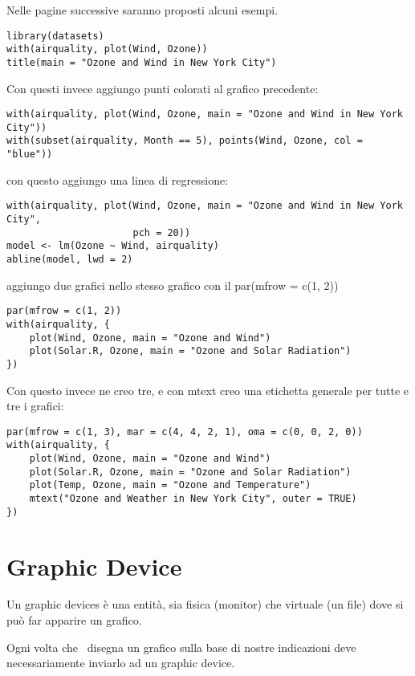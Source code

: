 Nelle pagine successive saranno proposti alcuni esempi.
\begin{lstlisting}
library(datasets)
with(airquality, plot(Wind, Ozone))
title(main = "Ozone and Wind in New York City") 
\end{lstlisting} 

Con questi invece aggiungo punti colorati al grafico precedente:
\begin{lstlisting}
with(airquality, plot(Wind, Ozone, main = "Ozone and Wind in New York City"))
with(subset(airquality, Month == 5), points(Wind, Ozone, col = "blue"))
\end{lstlisting} 



con questo aggiungo una linea di regressione:
\begin{lstlisting}
with(airquality, plot(Wind, Ozone, main = "Ozone and Wind in New York City", 
                      pch = 20))
model <- lm(Ozone ~ Wind, airquality)
abline(model, lwd = 2)
\end{lstlisting} 

aggiungo due grafici nello stesso grafico con il par(mfrow = c(1, 2))

\begin{lstlisting}
par(mfrow = c(1, 2))
with(airquality, {
    plot(Wind, Ozone, main = "Ozone and Wind")
    plot(Solar.R, Ozone, main = "Ozone and Solar Radiation")
})
\end{lstlisting} 

Con questo invece ne creo tre, e con mtext creo una etichetta generale per tutte e tre i grafici:
\begin{lstlisting}
par(mfrow = c(1, 3), mar = c(4, 4, 2, 1), oma = c(0, 0, 2, 0))
with(airquality, {
    plot(Wind, Ozone, main = "Ozone and Wind")
    plot(Solar.R, Ozone, main = "Ozone and Solar Radiation")
    plot(Temp, Ozone, main = "Ozone and Temperature")
    mtext("Ozone and Weather in New York City", outer = TRUE)
})
\end{lstlisting} 

\section{Graphic Device}

Un graphic devices è una entità, sia fisica (monitor) che virtuale (un file) dove si può far apparire un grafico.

Ogni volta che \erre\ disegna un grafico sulla base di nostre indicazioni deve necessariamente inviarlo ad un graphic device.

